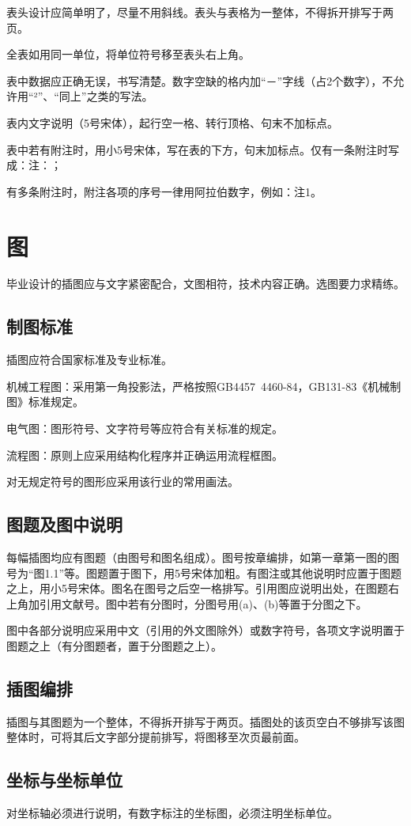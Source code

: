 表头设计应简单明了，尽量不用斜线。表头与表格为一整体，不得拆开排写于两页。

全表如用同一单位，将单位符号移至表头右上角。

表中数据应正确无误，书写清楚。数字空缺的格内加“－”字线（占2个数字），不允许用“²”、“同上”之类的写法。

表内文字说明（5号宋体），起行空一格、转行顶格、句末不加标点。

表中若有附注时，用小5号宋体，写在表的下方，句末加标点。仅有一条附注时写成：注：；

有多条附注时，附注各项的序号一律用阿拉伯数字，例如：注1。

\section{图}
毕业设计的插图应与文字紧密配合，文图相符，技术内容正确。选图要力求精练。

\subsection{制图标准}
插图应符合国家标准及专业标准。

机械工程图：采用第一角投影法，严格按照GB4457~4460-84，GB131-83《机械制图》标准规定。

电气图：图形符号、文字符号等应符合有关标准的规定。

流程图：原则上应采用结构化程序并正确运用流程框图。

对无规定符号的图形应采用该行业的常用画法。

\subsection{图题及图中说明}
每幅插图均应有图题（由图号和图名组成）。图号按章编排，如第一章第一图的图号为“图1.1”等。图题置于图下，用5号宋体加粗。有图注或其他说明时应置于图题之上，用小5号宋体。图名在图号之后空一格排写。引用图应说明出处，在图题右上角加引用文献号。图中若有分图时，分图号用(a)、(b)等置于分图之下。

图中各部分说明应采用中文（引用的外文图除外）或数字符号，各项文字说明置于图题之上（有分图题者，置于分图题之上）。
\subsection{插图编排}
插图与其图题为一个整体，不得拆开排写于两页。插图处的该页空白不够排写该图整体时，可将其后文字部分提前排写，将图移至次页最前面。
\subsection{坐标与坐标单位}
对坐标轴必须进行说明，有数字标注的坐标图，必须注明坐标单位。
